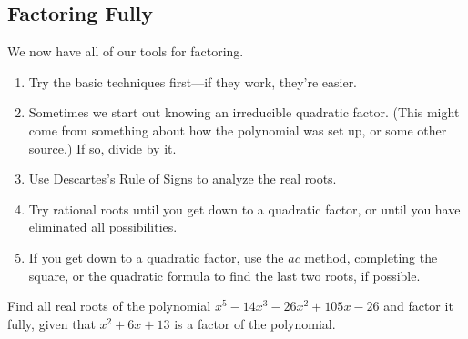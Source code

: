 \subsection{Factoring Fully} 
We now have all of our tools for factoring.
\begin{enumerate}
\item Try the basic techniques first---if they work, they're easier.
\item Sometimes we start out knowing an irreducible quadratic factor. (This might come from something about how the polynomial was set up, or some other source.) If so, divide by it.
\item Use Descartes's Rule of Signs to analyze the real roots.
\item Try rational roots until you get down to a quadratic factor, or until you have eliminated all possibilities.
\item If you get down to a quadratic factor, use the $ac$ method, completing the square, or the quadratic formula to find the last two roots, if possible.
\end{enumerate}
\begin{Example}
Find all real roots of the polynomial $x^5-14x^3-26x^2+105x-26$ and factor it fully, given that $x^2+6x+13$ is a factor of the polynomial.
\end{Example}
\fillpaper
\clearpage
\fillpaper
